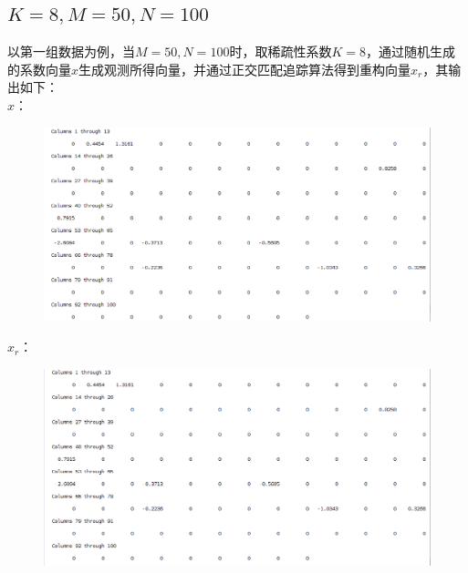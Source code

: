 \documentclass{article}
\begin{document}
\subsection{$ K=8,M=50,N=100 $}
以第一组数据为例，当$ M=50,N=100 $时，取稀疏性系数$ K=8 $，通过随机生成的系数向量$ x $生成观测所得向量，并通过正交匹配追踪算法得到重构向量$ x_r $，其输出如下：\\
$ x $：\\
\begin{figure}[H]
	\centering
	\includegraphics[scale=0.6]{x.png}
\end{figure}
$ x_r $：
\begin{figure}[H]
	\centering
	\includegraphics[scale=0.6]{x_r.png}
\end{figure}
\end{document}
